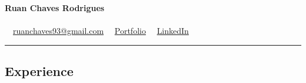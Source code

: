 \documentclass[11pt,letterpaper]{article}
\begin{document}
\begin{center}
	{\LARGE \textbf{Ruan Chaves Rodrigues}}\\
	\vspace{0.05cm} \ \\
	\raisebox{-0.2\height}{\Large \faEnvelopeSquare} \ \ \href{mailto://ruanchaves93@gmail.com}{ruanchaves93@gmail.com} \hfill \raisebox{-0.2\height}{\Large \faGithubSquare} \ \ \href{https://github.com/ruanchaves}{Portfolio} \hfill \raisebox{-0.2\height}{\Large \faLinkedinSquare} \ \ \href{https://linkedin.com/in/ruanchaves}{LinkedIn}
\end{center}

\hrule
\subsection*{\Large Experience}
\end{document}
